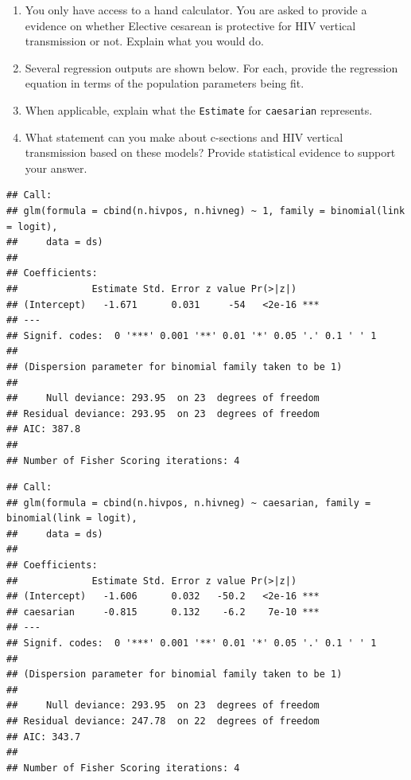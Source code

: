 \documentclass[landscape,twocolumn,letterpaper,9pt,reqno]{article}\usepackage[]{graphicx}\usepackage[]{color}
\newenvironment{knitrout}{}{} %
\newcommand{\compresslist}{ %
	\setlength{\itemsep}{1pt}
	\setlength{\parskip}{0pt}
	\setlength{\parsep}{0pt}
}
\begin{document}
\begin{enumerate}\compresslist
	\item You only have access to a hand calculator. You are asked to provide a evidence on whether Elective cesarean is protective for HIV vertical transmission or not. Explain what you would do. 
	\item Several regression outputs are shown below. For each, provide the regression equation in terms of the population parameters being fit. 
	\item When applicable, explain what the \texttt{Estimate} for \texttt{caesarian} represents. 
	\item What statement can you make about c-sections and HIV vertical transmission based on these models? Provide statistical evidence to support your answer.  
\end{enumerate}

\clearpage

\begin{knitrout}\small
{}\color{fgcolor}
\begin{verbatim}
## Call:
## glm(formula = cbind(n.hivpos, n.hivneg) ~ 1, family = binomial(link = logit), 
##     data = ds)
## 
## Coefficients:
##             Estimate Std. Error z value Pr(>|z|)    
## (Intercept)   -1.671      0.031     -54   <2e-16 ***
## ---
## Signif. codes:  0 '***' 0.001 '**' 0.01 '*' 0.05 '.' 0.1 ' ' 1
## 
## (Dispersion parameter for binomial family taken to be 1)
## 
##     Null deviance: 293.95  on 23  degrees of freedom
## Residual deviance: 293.95  on 23  degrees of freedom
## AIC: 387.8
## 
## Number of Fisher Scoring iterations: 4
\end{verbatim}

\end{knitrout}


\begin{knitrout}\small
{}\color{fgcolor}
\begin{verbatim}
## Call:
## glm(formula = cbind(n.hivpos, n.hivneg) ~ caesarian, family = binomial(link = logit), 
##     data = ds)
## 
## Coefficients:
##             Estimate Std. Error z value Pr(>|z|)    
## (Intercept)   -1.606      0.032   -50.2   <2e-16 ***
## caesarian     -0.815      0.132    -6.2    7e-10 ***
## ---
## Signif. codes:  0 '***' 0.001 '**' 0.01 '*' 0.05 '.' 0.1 ' ' 1
## 
## (Dispersion parameter for binomial family taken to be 1)
## 
##     Null deviance: 293.95  on 23  degrees of freedom
## Residual deviance: 247.78  on 22  degrees of freedom
## AIC: 343.7
## 
## Number of Fisher Scoring iterations: 4
\end{verbatim}

\end{knitrout}
\end{document}
